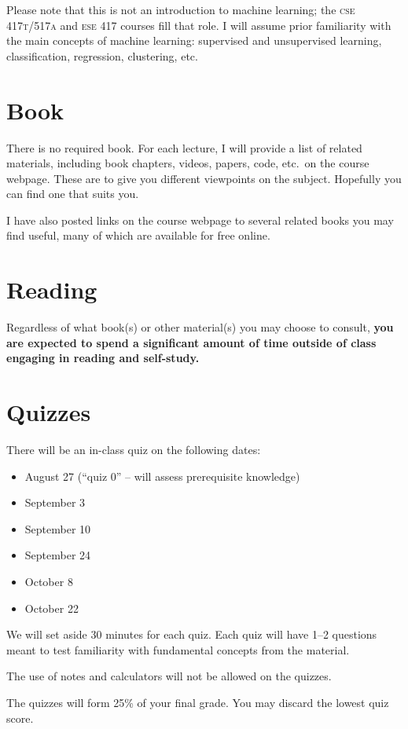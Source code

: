 \documentclass{article}
\newcommand{\acro}[1]{\textsc{\MakeLowercase{#1}}}
\begin{document}
Please note that this is not an introduction to machine learning; the \acro{CSE
  417T/517A} and \acro{ESE 417} courses fill that role.  I will assume prior
familiarity with the main concepts of machine learning: supervised and
unsupervised learning, classification, regression, clustering, etc.

\section*{Book}

There is no required book. For each lecture, I will provide a list of related
materials, including book chapters, videos, papers, code, etc.\ on the course
webpage.  These are to give you different viewpoints on the subject.  Hopefully
you can find one that suits you.

I have also posted links on the course webpage to several related books you may
find useful, many of which are available for free online.

\section*{Reading}

Regardless of what book(s) or other material(s) you may choose to consult,
\textbf{you are expected to spend a significant amount of time outside of class
  engaging in reading and self-study.}

\section*{Quizzes}

There will be an in-class quiz on the following dates:
\begin{itemize}
  \item August 27 (``quiz 0'' -- will assess prerequisite knowledge)
  \item September 3
  \item September 10
  \item September 24
  \item October 8
  \item October 22
\end{itemize}
We will set aside 30 minutes for each quiz. Each quiz will have 1--2
questions meant to test familiarity with fundamental concepts from the material.

The use of notes and calculators will not be allowed on the quizzes.

The quizzes will form 25\% of your final grade. You may discard the lowest quiz
score.
\end{document}
